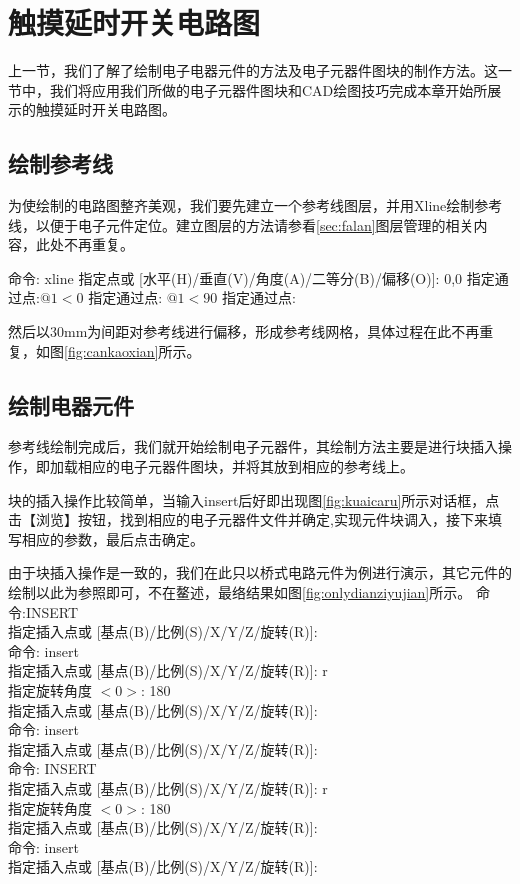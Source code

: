 \section{触摸延时开关电路图}
上一节，我们了解了绘制电子电器元件的方法及电子元器件图块的制作方法。这一节中，我们将应用我们所做的电子元器件图块和CAD绘图技巧完成本章开始所展示的触摸延时开关电路图。
\subsection{绘制参考线}
为使绘制的电路图整齐美观，我们要先建立一个参考线图层，并用Xline绘制参考线，以便于电子元件定位。建立图层的方法请参看\ref{sec:falan}图层管理的相关内容，此处不再重复。

\noindent
命令: xline
指定点或 [水平(H)/垂直(V)/角度(A)/二等分(B)/偏移(O)]: 0,0
指定通过点:$ @1<0$
指定通过点: $@1<90$
指定通过点:

然后以30mm为间距对参考线进行偏移，形成参考线网格，具体过程在此不再重复，如图\ref{fig:cankaoxian}所示。

\noindent
\begin{figure}[htbp]
\centering
\begin{floatrow}
\end{floatrow}
\end{figure}
\subsection{绘制电器元件}
参考线绘制完成后，我们就开始绘制电子元器件，其绘制方法主要是进行块插入操作，即加载相应的电子元器件图块，并将其放到相应的参考线上。

块的插入操作比较简单，当输入insert后好即出现图\ref{fig:kuaicaru}所示对话框，点击【浏览】按钮，找到相应的电子元器件文件并确定,实现元件块调入，接下来填写相应的参数，最后点击确定。

由于块插入操作是一致的，我们在此只以桥式电路元件为例进行演示，其它元件的绘制以此为参照即可，不在鳌述，最络结果如图\ref{fig:onlydianziyujian}所示。
\noindent
命令:INSERT\\
指定插入点或 [基点(B)/比例(S)/X/Y/Z/旋转(R)]:\\
命令: insert\\
指定插入点或 [基点(B)/比例(S)/X/Y/Z/旋转(R)]: r\\
指定旋转角度 $<0>$: 180\\
指定插入点或 [基点(B)/比例(S)/X/Y/Z/旋转(R)]:\\
命令: insert\\
指定插入点或 [基点(B)/比例(S)/X/Y/Z/旋转(R)]:\\
命令: INSERT\\
指定插入点或 [基点(B)/比例(S)/X/Y/Z/旋转(R)]: r\\
指定旋转角度 $<0>$: 180\\
指定插入点或 [基点(B)/比例(S)/X/Y/Z/旋转(R)]:\\
命令: insert\\
指定插入点或 [基点(B)/比例(S)/X/Y/Z/旋转(R)]:\\

